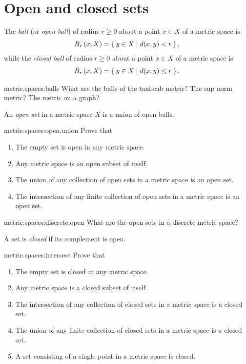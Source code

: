 \section{Open and closed sets}
The \emph{ball} (or \emph{open ball}) of radius \(r \ge 0\) about a point \(x \in X\) of a metric space is
\[
\ball[X]{r}{x} = \Set{y \in X|d(x,y)<r},
\]
while the \emph{closed ball} of radius \(r \ge 0\) about a point \(x \in X\) of a metric space is
\[
\ballClosed[X]{r}{x} = \Set{y \in X|d(x,y)\le r}.
\]
\begin{problem}{metric.spaces:balls}
What are the balls of the taxi-cab metric? The sup norm metric? The metric on a graph? 
\end{problem}
An \emph{open set} in a metric space \(X\) is a union of open balls.
\begin{problem}{metric.spaces:open.union}
Prove that 
\begin{enumerate}
\item
The empty set is open in any metric space.
\item 
Any metric space is an open subset of itself.
\item
The union of any collection of open sets in a metric space is an open set.
\item
The intersection of any finite collection of open sets in a metric space is an open set.
\end{enumerate}
\end{problem}
\begin{problem}{metric.spaces:discrete.open}
What are the open sets in a discrete metric space?
\end{problem}
A set is \emph{closed} if its complement is open.
\begin{problem}{metric.spaces:intersect}
Prove that 
\begin{enumerate}
\item
The empty set is closed in any metric space.
\item 
Any metric space is a closed subset of itself.
\item
The intersection of any collection of closed sets in a metric space is a closed set.
\item
The union of any finite collection of closed sets in a metric space is a closed set.
\item
A set consisting of a single point in a metric space is closed.
\end{enumerate}
\end{problem}

